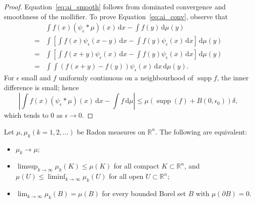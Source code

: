     \begin{proof}
    Equation~\eqref{eq:ai_smooth} follows from dominated convergence and smoothness of the mollifier. To prove Equation~\eqref{eq:ai_conv}, observe that
    \begin{align*}
     & \int f(x)(\psi _{\epsilon}*\mu)(x)\,\mathrm{d}x-\int f(y)\,\mathrm{d}\mu(y) \\
    = & \int\left[\int f(x)\psi _{\epsilon}(x-y)\,\mathrm{d}x-\int f(y)\psi _{\epsilon}(x)\,\mathrm{d}x\right] \,\mathrm{d}\mu(y) \\
    = & \int\left[\int f(x+y)\psi _{\epsilon}(x)\,\mathrm{d}x-\int f(y)\psi _{\epsilon}(x)\,\mathrm{d}x\right] \,\mathrm{d}\mu(y)  \\
    = & \int \int (f(x+y)-f(y))\psi _{\epsilon}(x)\,\mathrm{d}x\,\mathrm{d}\mu(y).
    \end{align*}
    For $\epsilon$ small and $f$ uniformly continuous on a neighbourhood of $\operatorname{supp}f$, the inner difference is small; hence
    \begin{equation*}
        \left|\int f(x)(\psi _{\epsilon}*\mu)(x)\,\mathrm{d}x-\int f\,\mathrm{d}\mu\right|\leq \mu(\operatorname{supp}(f)+B(0,\epsilon_{0}))\delta,
    \end{equation*}
    which tends to $0$ as $\epsilon\to 0$.
    \end{proof}

    \begin{theorem}
    \label{thm:weakconv_equiv}
    Let $\mu,\mu _{k}(k=1,2,\dots)$ be Radon measures on $\mathbb{R}^{n}$. The following are equivalent:
        \begin{itemize}
            \item[(i)] $\mu _{k}\to \mu$;
            \item[(ii)] $\limsup_{k\to \infty}\mu _{k}(K)\leq \mu(K)$ for all compact $K\subset \mathbb{R}^{n}$, and $\mu(U)\leq \liminf_{k\to \infty}\mu_{k}(U)$ for all open $U\subset \mathbb{R}^{n}$;
            \item[(iii)] $\lim_{ k \to \infty }\mu _{k}(B)=\mu(B)$ for every bounded Borel set $B$ with $\mu(\partial B)=0$.
        \end{itemize}
    \end{theorem}

